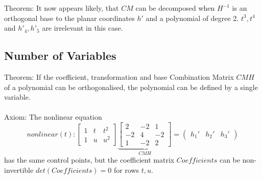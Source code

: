 \documentclass[a4paper,landscape]{report}
\begin{document}
Theorem: It now appears likely, that $CM$ can be decomposed when $H^{-1}$ is an orthogonal base to the planar coordinates $h'$ and a polynomial of degree 2. $t^3,t^4$ and $h'_{4},h'_{5}$ are irrelevant in this case.

\subsection{Number of Variables}
Theorem: If the coefficient, transformation and base Combination Matrix $CMH$ of a polynomial can be orthogonalised, the polynomial can be defined by a single variable.\\\\
Axiom: The nonlinear equation
\begin{equation}
nonlinear(t):
\begin{bmatrix}
1 & t & t^2\\
1 & u & u^2
\end{bmatrix}
\underbrace{\begin{bmatrix}
2 & -2 & 1\\
-2 & 4 & -2\\
1 & -2 & 2
\end{bmatrix}}_{CMH}
=
\begin{pmatrix}
h_{1}' & h_{2}' & h_{3}'
\end{pmatrix}
\end{equation}
has the same control points, but the coefficient matrix $Coefficients$ can be non-invertible $det(Coefficients)=0$ for rows $t,u$.

\iffalse
\chapter{Limited Image}
If an orthonormal base can be found for the $Image \in \mathbb{Z}^3$
\begin{equation}
orthonormal(t):
\begin{pmatrix}
1 & t & t^2
\end{pmatrix}
\underbrace{\begin{pmatrix}
1 & 0 & 0\\
0 & 1 & 0\\
0 & 0 & 1
\end{pmatrix}}_{Coefficients}
\underbrace{\begin{bmatrix}
Me_{1} & Me_{2} & Me_{3}
\end{bmatrix}}_{Base}
=
\underbrace{
\lambda
\begin{bmatrix}
Me_{1}' & Me_{2}' & Me_{3}'
\end{bmatrix}}_{Image}
\end{equation}
there do not exist any polynomials other than the one expressed by the product of the coefficient matrix $Coefficients$ and the $Base$. It is a (diffeo?)morphism.\\\\
For a Lie Group a characteristic polynomial can be found
\begin{align}
orthonormal_{Coefficients,Base}(\lambda): \text{GL(3,R)} \rightarrow Polynomial\\
GL(3,R) = ONB(a,b); [a,b] \subseteq \text{Chart of }Domain
\end{align}
\fi
\end{document}
